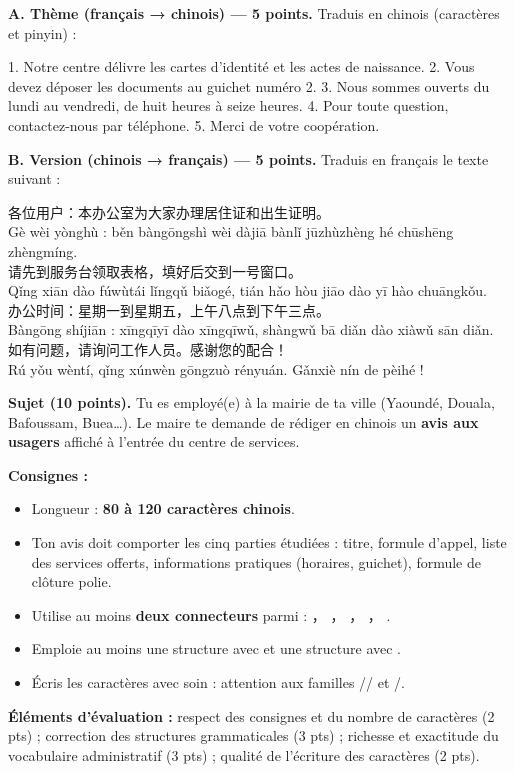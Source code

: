 \documentclass[11pt]{article}
\newcommand{\zh}[1]{\ifmmode\text{#1}\else{#1}\fi}
\begin{document}
\begin{exercice}
\textbf{A. Thème (français → chinois) — 5 points.} Traduis en chinois (caractères et pinyin) :

1. Notre centre délivre les cartes d'identité et les actes de naissance.
2. Vous devez déposer les documents au guichet numéro 2.
3. Nous sommes ouverts du lundi au vendredi, de huit heures à seize heures.
4. Pour toute question, contactez-nous par téléphone.
5. Merci de votre coopération.

\textbf{B. Version (chinois → français) — 5 points.} Traduis en français le texte suivant :

\begin{textebox}[Version]
各位用户：本办公室为大家办理居住证和出生证明。\\
Gè wèi yònghù : běn bàngōngshì wèi dàjiā bànlǐ jūzhùzhèng hé chūshēng zhèngmíng.\\[4pt]
请先到服务台领取表格，填好后交到一号窗口。\\
Qǐng xiān dào fúwùtái lǐngqǔ biǎogé, tián hǎo hòu jiāo dào yī hào chuāngkǒu.\\[4pt]
办公时间：星期一到星期五，上午八点到下午三点。\\
Bàngōng shíjiān : xīngqīyī dào xīngqīwǔ, shàngwǔ bā diǎn dào xiàwǔ sān diǎn.\\[4pt]
如有问题，请询问工作人员。感谢您的配合！\\
Rú yǒu wèntí, qǐng xúnwèn gōngzuò rényuán. Gǎnxiè nín de pèihé !
\end{textebox}
\end{exercice}

\begin{exercice}
\textbf{Sujet (10 points).} Tu es employé(e) à la mairie de ta ville (Yaoundé, Douala, Bafoussam, Buea\ldots). Le maire te demande de rédiger en chinois un \textbf{avis aux usagers} affiché à l'entrée du centre de services.

\textbf{Consignes :}
\begin{itemize}
\item Longueur : \textbf{80 à 120 caractères chinois}.
\item Ton avis doit comporter les cinq parties étudiées : titre, formule d'appel, liste des services offerts, informations pratiques (horaires, guichet), formule de clôture polie.
\item Utilise au moins \textbf{deux connecteurs} parmi : \zh{为了}， \zh{首先}， \zh{然后}， \zh{以及}， \zh{如果}.
\item Emploie au moins une structure avec \zh{请} et une structure avec \zh{把}.
\item Écris les caractères avec soin : attention aux familles \zh{请}/\zh{清}/\zh{情} et \zh{问}/\zh{间}.
\end{itemize}

\textbf{Éléments d'évaluation :} respect des consignes et du nombre de caractères (2 pts) ; correction des structures grammaticales (3 pts) ; richesse et exactitude du vocabulaire administratif (3 pts) ; qualité de l'écriture des caractères (2 pts).
\end{exercice}
\end{document}
